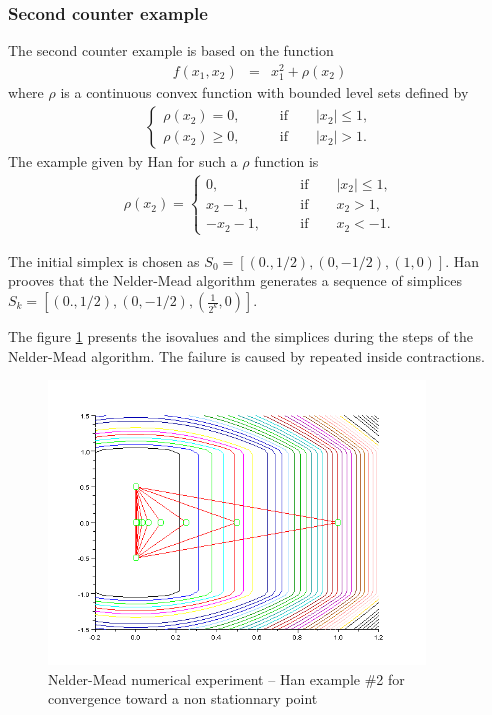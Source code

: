 \subsubsection{Second counter example}

The second counter example is based on the function 
\begin{eqnarray}
\label{han-function2}
f(x_1,x_2) &=& x_1^2 + \rho(x_2)
\end{eqnarray}
where $\rho$ is a continuous convex function with bounded level
sets defined by
\begin{eqnarray}
\label{han-function2-rho}
\left\{
\begin{array}{ll}
\rho(x_2) =0, &\qquad \textrm{if} \qquad |x_2|\leq 1, \\
\rho(x_2)\geq 0, &\qquad \textrm{if} \qquad |x_2|> 1.
\end{array}
\right.
\end{eqnarray}
The example given by Han for such a $\rho$ function is 
\begin{eqnarray}
\label{han-function2-rho2}
\rho(x_2) =
\left\{
\begin{array}{ll}
0, &\qquad \textrm{if} \qquad |x_2|\leq 1, \\
x_2 - 1, &\qquad \textrm{if} \qquad x_2> 1, \\
-x_2 - 1, &\qquad \textrm{if} \qquad x_2 < -1.
\end{array}
\right.
\end{eqnarray}

The initial simplex is chosen as $S_0 = [(0.,1/2),(0,-1/2),(1,0)]$.
Han prooves that the Nelder-Mead algorithm generates a sequence of simplices
$S_k = [(0.,1/2),(0,-1/2),(\frac{1}{2^k},0)]$.

The figure \ref{fig-nm-numexp-han2} presents the isovalues and the 
simplices during the steps of the Nelder-Mead algorithm.
The failure is caused by repeated inside contractions.

\begin{figure}
\begin{center}
\includegraphics[width=10cm]{han2-history-simplex.png}
\end{center}
\caption{Nelder-Mead numerical experiment -- Han example \#2 for convergence toward
a non stationnary point}
\label{fig-nm-numexp-han2}
\end{figure}

